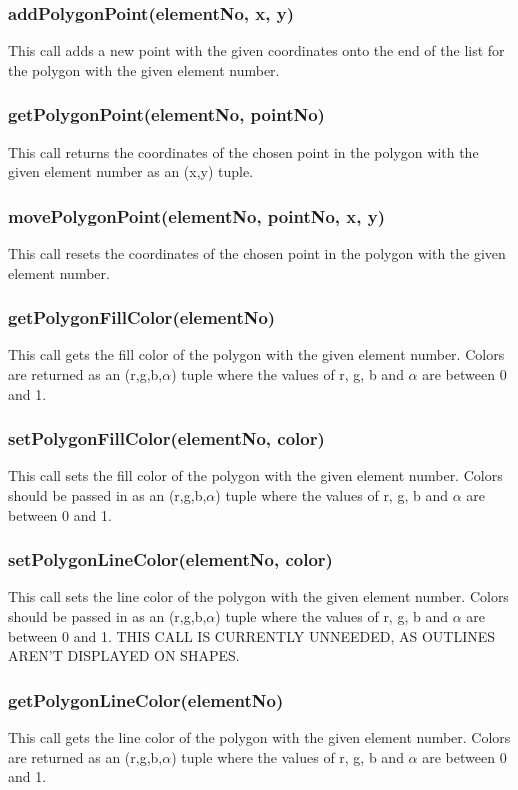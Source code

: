 \documentclass{acm_proc_article-sp}
\begin{document}
\subsubsection{addPolygonPoint(elementNo, x, y)}
This call adds a new point with the given coordinates onto the end of the list for the polygon with the given element number.
\subsubsection{getPolygonPoint(elementNo, pointNo)}
This call returns the coordinates of the chosen point in the polygon with the given element number as an (x,y) tuple.
\subsubsection{movePolygonPoint(elementNo, pointNo, x, y)}
This call resets the coordinates of the chosen point in the polygon with the given element number.
\subsubsection{getPolygonFillColor(elementNo)}
This call gets the fill color of the polygon with the given element number. Colors are returned as an (r,g,b,$\alpha$) tuple where the values of r, g, b and $\alpha$ are between 0 and 1.
\subsubsection{setPolygonFillColor(elementNo, color)}
This call sets the fill color of the polygon with the given element number. Colors should be passed in as an (r,g,b,$\alpha$) tuple where the values of r, g, b and $\alpha$ are between 0 and 1.
\subsubsection{setPolygonLineColor(elementNo, color)}
This call sets the line color of the polygon with the given element number. Colors should be passed in as an (r,g,b,$\alpha$) tuple where the values of r, g, b and $\alpha$ are between 0 and 1. THIS CALL IS CURRENTLY UNNEEDED, AS OUTLINES AREN'T DISPLAYED ON SHAPES.
\subsubsection{getPolygonLineColor(elementNo)}
This call gets the line color of the polygon with the given element number. Colors are returned as an (r,g,b,$\alpha$) tuple where the values of r, g, b and $\alpha$ are between 0 and 1.
\end{document}
